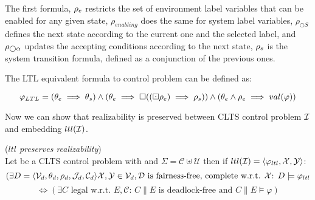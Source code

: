 The first formula, ${\rho_e}$ restricts the set of environment label variables that can be enabled for any given state, $\rho_{enabling}$ does the same for system label variables, $\rho_{\bigcirc S}$ defines the next state according to the current one and the selected label, and $\rho_{\bigcirc \alpha}$ updates the accepting conditions according to the next state, ${\rho_s}$ is the system transition formula, defined as a conjunction of the previous ones.
%
%


The LTL equivalent formula to control problem \controlProblemDef can be defined as:

\[ \varphi_{LTL} = (\theta_e \implies \theta_s) \wedge (\theta_e \implies \square((\boxdot \rho_e) \implies \rho_s)) \wedge (\theta_e \wedge \rho_e \implies val(\varphi)) \]

Now we can show that realizability is preserved between CLTS control problem $\mathcal{I}$ and embedding $ltl(\mathcal{I})$.

\begin{theorem}(\emph{$ltl$ preserves realizability})\label{theorem:gs_preserves_realizability}\\
	Let \controlProblemDef be a CLTS control problem with  and $\Sigma = \mathcal{C}\uplus \mathcal{U}$ then if $ltl(\mathcal{I}) = \langle \varphi_{ltl}, {\mathcal{X}}, {\mathcal{Y}}\rangle$:
	\small
	\[(\exists D= \langle \mathcal{V}_d, \theta_d, \rho_d, \mathcal{J}_d, \mathcal{C}_d\rangle    {\mathcal{X}}, {\mathcal{Y}} \in \mathcal{V}_d, \mathcal{D} \text{ is fairness-free, complete w.r.t. } {\mathcal{X}} \text{: } D \models \varphi_{ltl}\]
	 \[ \iff (\exists C \text{ legal w.r.t. } E,\mathcal{C} \text{: } C \parallel E \text{ is deadlock-free and } C \parallel E \models \varphi)  \]
	\normalsize
\end{theorem}


